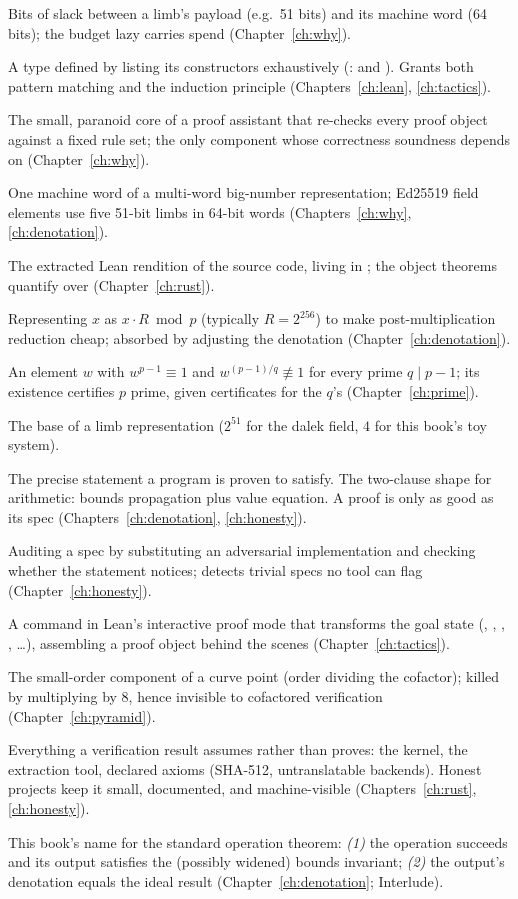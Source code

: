  Bits of slack between a limb's payload (e.g.\ 51 bits)
and its machine word (64 bits); the budget lazy carries spend
(Chapter~\ref{ch:why}).

 A type defined by listing its constructors
exhaustively (:  and ). Grants both
pattern matching and the induction principle (Chapters~\ref{ch:lean},
\ref{ch:tactics}).

 The small, paranoid core of a proof assistant that
re-checks every proof object against a fixed rule set; the only
component whose correctness soundness depends on
(Chapter~\ref{ch:why}).

 One machine word of a multi-word big-number
representation; Ed25519 field elements use five 51-bit limbs in 64-bit
words (Chapters~\ref{ch:why}, \ref{ch:denotation}).

 The extracted Lean rendition of the source code, living
in ; the object theorems quantify over
(Chapter~\ref{ch:rust}).

 Representing $x$ as $x \cdot R \bmod p$
(typically $R = 2^{256}$) to make post-multiplication reduction cheap;
absorbed by adjusting the denotation (Chapter~\ref{ch:denotation}).

 An element $w$ with $w^{p-1} \equiv 1$ and
$w^{(p-1)/q} \not\equiv 1$ for every prime $q \mid p-1$; its existence
certifies $p$ prime, given certificates for the $q$'s
(Chapter~\ref{ch:prime}).

 The base of a limb representation ($2^{51}$ for the
dalek field, $4$ for this book's toy system).

 The precise statement a program is proven
to satisfy. The two-clause shape for arithmetic: bounds propagation
plus value equation. A proof is only as good as its spec
(Chapters~\ref{ch:denotation}, \ref{ch:honesty}).

 Auditing a spec by substituting an
adversarial implementation and checking whether the statement notices;
detects trivial specs no tool can flag (Chapter~\ref{ch:honesty}).

 A command in Lean's interactive proof mode that
transforms the goal state (, , ,
, \dots), assembling a proof object behind the scenes
(Chapter~\ref{ch:tactics}).

 The small-order component of a curve point (order
dividing the cofactor); killed by multiplying by $8$, hence invisible
to cofactored verification (Chapter~\ref{ch:pyramid}).

 Everything a verification result assumes rather
than proves: the kernel, the extraction tool, declared axioms
(SHA-512, untranslatable backends). Honest projects keep it small,
documented, and machine-visible (Chapters~\ref{ch:rust},
\ref{ch:honesty}).

 This book's name for the standard operation
theorem: \emph{(1)} the operation succeeds and its output satisfies the
(possibly widened) bounds invariant; \emph{(2)} the output's denotation
equals the ideal result (Chapter~\ref{ch:denotation}; Interlude).
